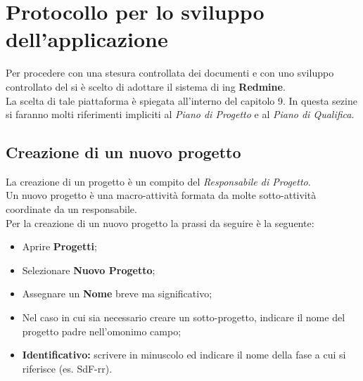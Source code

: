 \section{Protocollo per lo sviluppo dell’applicazione}
  Per procedere con una stesura controllata dei documenti e con uno sviluppo controllato del  si è scelto di adottare
  il sistema di ing \textbf{Redmine}.\\
  La scelta di tale piattaforma è spiegata all'interno del capitolo 9.
  In questa sezine si faranno molti riferimenti impliciti al \emph{Piano di Progetto} e al \emph{Piano di  Qualifica}.
  \subsection{Creazione di un nuovo progetto}
    La creazione di un progetto è un compito del \emph{Responsabile di Progetto}.\\
    Un nuovo progetto è una macro-attività formata da molte sotto-attività coordinate da un responsabile.\\
    Per la creazione di un nuovo progetto la prassi da seguire è la seguente:
    \begin{itemize}
      \item Aprire \textbf{Progetti};
      \item Selezionare \textbf{Nuovo Progetto};
      \item Assegnare un \textbf{Nome} breve ma significativo;
      \item Nel caso in cui sia necessario creare un sotto-progetto, indicare il nome del progetto padre nell'omonimo campo;
      \item \textbf{Identificativo: }scrivere in minuscolo ed indicare il nome della fase a cui si riferisce (es. SdF-rr).
    \end{itemize}
